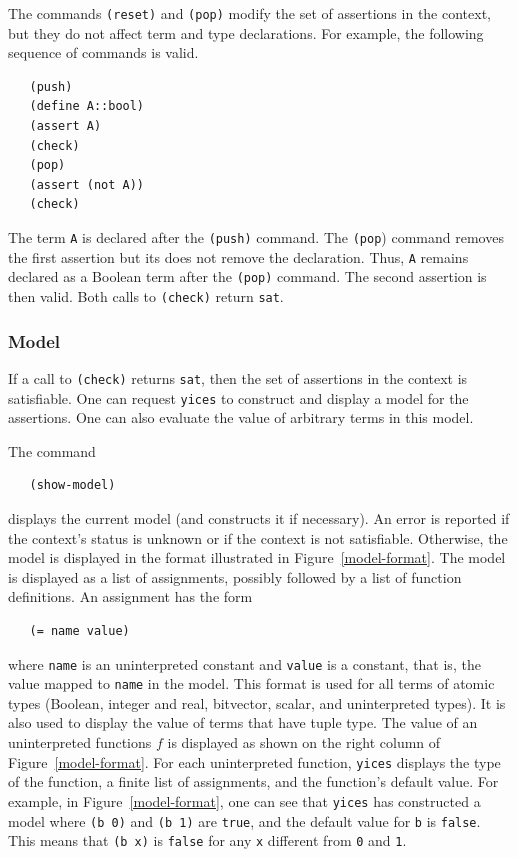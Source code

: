 \documentclass[11pt,twoside,fleqn,openright,titlepage]{cslreport}
\begin{document}
\medskip\noindent
The commands \texttt{(reset)} and \texttt{(pop)} modify the set of
assertions in the context, but they do not affect term and type
declarations. For example, the following sequence of commands is
valid.
\begin{small}
\begin{verbatim}
   (push)
   (define A::bool)
   (assert A)
   (check)
   (pop)
   (assert (not A))
   (check)
\end{verbatim}
\end{small}
The term \texttt{A} is declared after the \texttt{(push)} command. The
\texttt{(pop}) command removes the first assertion but its does not
remove the declaration. Thus, \texttt{A} remains declared as a Boolean
term after the \texttt{(pop)} command. The second assertion is then
valid. Both calls to \texttt{(check)} return \texttt{sat}.


\subsubsection*{Model}

If a call to \texttt{(check)} returns \texttt{sat}, then the set of
assertions in the context is satisfiable. One can request
\texttt{yices} to construct and display a model for the
assertions. One can also evaluate the value of arbitrary terms in this
model.

\medskip\noindent
The command
\begin{small}
\begin{verbatim}
   (show-model)
\end{verbatim}
\end{small}
displays the current model (and constructs it if necessary). An error
is reported if the context's status is unknown or if the context is
not satisfiable. Otherwise, the model is displayed in the format
illustrated in Figure~\ref{model-format}. The model is displayed as a
list of assignments, possibly followed by a list of function
definitions. An assignment has the form
\begin{small}
\begin{verbatim}
   (= name value)
\end{verbatim}
\end{small}
where \texttt{name} is an uninterpreted constant and
\texttt{value} is a constant, that is, the value mapped to
\texttt{name} in the model. This format is used for all terms of
atomic types (Boolean, integer and real, bitvector, scalar, and
uninterpreted types). It is also used to display the value of terms
that have tuple type. The value of an uninterpreted functions $f$ is
displayed as shown on the right column of Figure~\ref{model-format}.
For each uninterpreted function, \texttt{yices} displays the type of
the function, a finite list of assignments, and the function's default
value. For example, in Figure~\ref{model-format}, one can see that
\texttt{yices} has constructed a model where \texttt{(b 0)} and
\texttt{(b 1)} are \texttt{true}, and the default value for \texttt{b}
is \texttt{false}.  This means that \texttt{(b x)} is \texttt{false}
for any \texttt{x} different from \texttt{0} and \texttt{1}.
\end{document}

